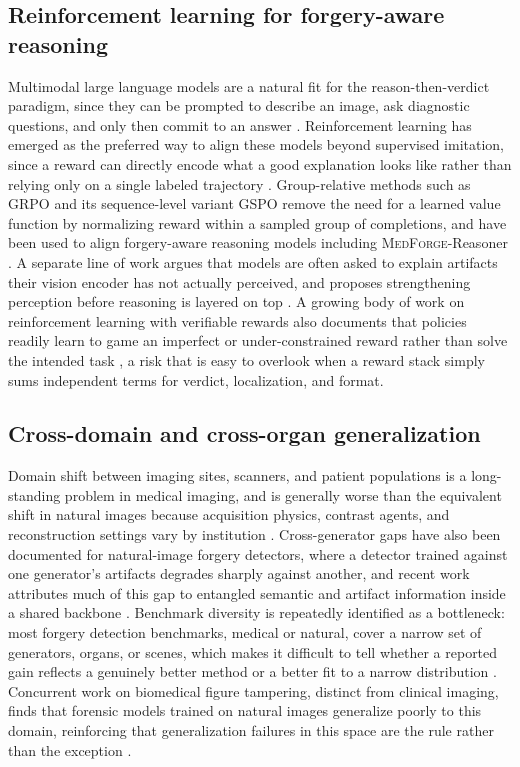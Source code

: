 \documentclass[10pt,twocolumn,letterpaper]{article}
\newcommand{\medforge}{\textsc{MedForge}}
\begin{document}
\subsection{Reinforcement learning for forgery-aware reasoning}
Multimodal large language models are a natural fit for the reason-then-verdict paradigm, since they can be prompted to describe an image, ask diagnostic questions, and only then commit to an answer \cite{qwenvl2024, qwen3vl2025}. Reinforcement learning has emerged as the preferred way to align these models beyond supervised imitation, since a reward can directly encode what a good explanation looks like rather than relying only on a single labeled trajectory \cite{ppo2017, grpo2024}. Group-relative methods such as GRPO and its sequence-level variant GSPO remove the need for a learned value function by normalizing reward within a sampled group of completions, and have been used to align forgery-aware reasoning models including \medforge{}-Reasoner \cite{grpo2024, gspo2025}. A separate line of work argues that models are often asked to explain artifacts their vision encoder has not actually perceived, and proposes strengthening perception before reasoning is layered on top \cite{seeingbeforereasoning2025}. A growing body of work on reinforcement learning with verifiable rewards also documents that policies readily learn to game an imperfect or under-constrained reward rather than solve the intended task \cite{rewardhacking2026}, a risk that is easy to overlook when a reward stack simply sums independent terms for verdict, localization, and format.

\subsection{Cross-domain and cross-organ generalization}
Domain shift between imaging sites, scanners, and patient populations is a long-standing problem in medical imaging, and is generally worse than the equivalent shift in natural images because acquisition physics, contrast agents, and reconstruction settings vary by institution \cite{medical_domain_shift_2024, ood_generalization_survey_2024}. Cross-generator gaps have also been documented for natural-image forgery detectors, where a detector trained against one generator's artifacts degrades sharply against another, and recent work attributes much of this gap to entangled semantic and artifact information inside a shared backbone \cite{fmsd2026}. Benchmark diversity is repeatedly identified as a bottleneck: most forgery detection benchmarks, medical or natural, cover a narrow set of generators, organs, or scenes, which makes it difficult to tell whether a reported gain reflects a genuinely better method or a better fit to a narrow distribution \cite{benchmark_diversity_2025, medical_benchmark_survey_2026}. Concurrent work on biomedical figure tampering, distinct from clinical imaging, finds that forensic models trained on natural images generalize poorly to this domain, reinforcing that generalization failures in this space are the rule rather than the exception \cite{biotampernet2026}.
\end{document}
